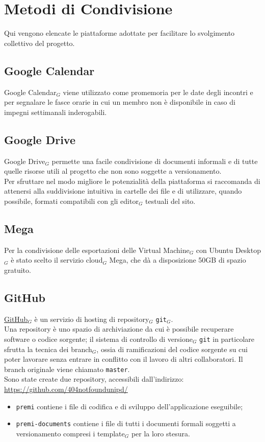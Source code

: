 \section{Metodi di Condivisione}

Qui vengono elencate le piattaforme adottate per facilitare lo svolgimento collettivo del progetto. \\

\subsection{Google Calendar}
Google Calendar$_{G}$ viene utilizzato come promemoria per le date degli incontri e per segnalare le fasce orarie in cui un membro non è disponibile in caso di impegni settimanali inderogabili. \\

\subsection{Google Drive}
Google Drive$_{G}$ permette una facile condivisione di documenti informali e di tutte quelle risorse utili al progetto che non sono soggette a versionamento. \\
Per sfruttare nel modo migliore le potenzialità della piattaforma si raccomanda di attenersi alla suddivisione intuitiva in cartelle dei file e di utilizzare, quando possibile, formati compatibili con gli editor$_{G}$ testuali del sito.

\subsection{Mega}
Per la condivisione delle esportazioni delle Virtual Machine$_{G}$ con Ubuntu Desktop$_{G}$ è stato scelto il servizio cloud$_{G}$ Mega, che dà a disposizione 50GB di spazio gratuito.

\subsection{GitHub}
\href{http://www.github.com/}{GitHub}$_{G}$ è un servizio di hosting di repository$_{G}$ \texttt{git}$_{G}$. \\
Una repository è uno spazio di archiviazione da cui è possibile recuperare software o codice sorgente; il sistema di controllo di versione$_{G}$ \texttt{git} in particolare sfrutta la tecnica dei branch$_{G}$, ossia di ramificazioni del codice sorgente su cui poter lavorare senza  entrare in conflitto con il lavoro di altri collaboratori. Il branch originale viene chiamato \texttt{master}. \\
Sono state create due repository, accessibili dall'indirizzo:\\ 
\url{https://github.com/404notfoundunipd/}
\begin{itemize}
\item \texttt{premi} contiene i file di codifica e di sviluppo dell'applicazione eseguibile;
\item \texttt{premi-documents} contiene i file di tutti i documenti formali soggetti a versionamento compresi i template$_{G}$ per la loro stesura.
\end{itemize}



